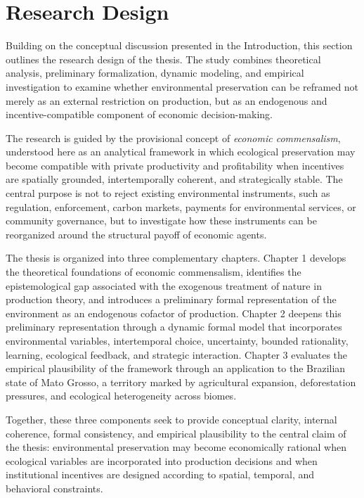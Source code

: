 
\section{Research Design}

Building on the conceptual discussion presented in the Introduction, this section outlines the research design of the thesis. The study combines theoretical analysis, preliminary formalization, dynamic modeling, and empirical investigation to examine whether environmental preservation can be reframed not merely as an external restriction on production, but as an endogenous and incentive-compatible component of economic decision-making.

The research is guided by the provisional concept of \emph{economic commensalism}, understood here as an analytical framework in which ecological preservation may become compatible with private productivity and profitability when incentives are spatially grounded, intertemporally coherent, and strategically stable. The central purpose is not to reject existing environmental instruments, such as regulation, enforcement, carbon markets, payments for environmental services, or community governance, but to investigate how these instruments can be reorganized around the structural payoff of economic agents.

The thesis is organized into three complementary chapters. Chapter 1 develops the theoretical foundations of economic commensalism, identifies the epistemological gap associated with the exogenous treatment of nature in production theory, and introduces a preliminary formal representation of the environment as an endogenous cofactor of production. Chapter 2 deepens this preliminary representation through a dynamic formal model that incorporates environmental variables, intertemporal choice, uncertainty, bounded rationality, learning, ecological feedback, and strategic interaction. Chapter 3 evaluates the empirical plausibility of the framework through an application to the Brazilian state of Mato Grosso, a territory marked by agricultural expansion, deforestation pressures, and ecological heterogeneity across biomes.

Together, these three components seek to provide conceptual clarity, internal coherence, formal consistency, and empirical plausibility to the central claim of the thesis: environmental preservation may become economically rational when ecological variables are incorporated into production decisions and when institutional incentives are designed according to spatial, temporal, and behavioral constraints.


